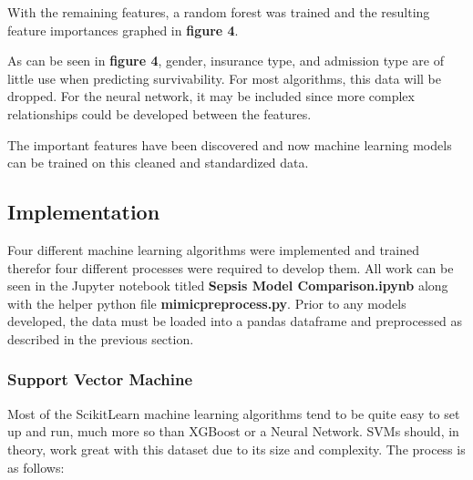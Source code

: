 \documentclass[11pt]{article}
\begin{document}
		With the remaining features, a random forest was trained and the resulting feature importances graphed in \textbf{figure 4}.
		
	
		As can be seen in \textbf{figure 4}, gender, insurance type, and admission type are of little use when predicting survivability. For most algorithms, this data will be dropped. For the neural network, it may be included since more complex relationships could be developed between the features.
	
		The important features have been discovered and now machine learning models can be trained on this cleaned and standardized data.
	
	\subsection{Implementation}
	Four different machine learning algorithms were implemented and trained therefor four different processes were required to develop them. All work can be seen in the Jupyter notebook titled \textbf{Sepsis Model Comparison.ipynb} along with the helper python file \textbf{mimicpreprocess.py}. Prior to any models developed, the data must be loaded into a pandas dataframe and preprocessed as described in the previous section.
	
	\subsubsection{Support Vector Machine}
		Most of the ScikitLearn machine learning algorithms tend to be quite easy to set up and run, much more so than XGBoost or a Neural Network. SVMs should, in theory, work great with this dataset due to its size and complexity. The process is as follows:
		
\end{document}
